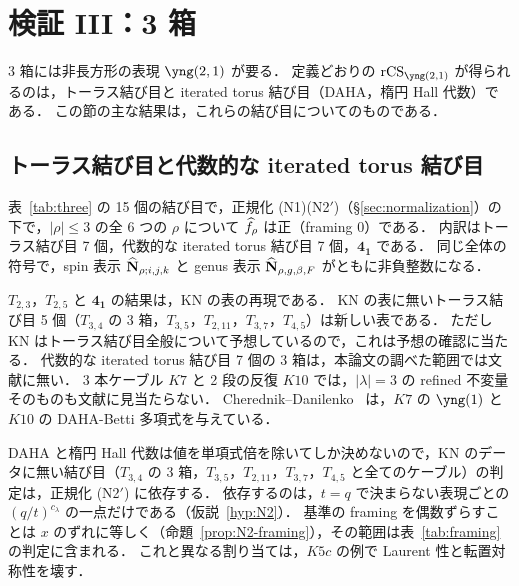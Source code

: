 \section{検証 III：3 箱}\label{sec:three}

3 箱には非長方形の表現 $\yng(2,1)$ が要る．
定義どおりの $\rCS_{\yng(2,1)}$ が得られるのは，トーラス結び目と iterated torus 結び目（DAHA，楕円 Hall 代数）である．
この節の主な結果は，これらの結び目についてのものである．

\subsection{トーラス結び目と代数的な iterated torus 結び目}
\begin{compresult}\label{cr:three}
表~\ref{tab:three} の 15 個の結び目で，正規化 (N1)(N2$'$)（\S\ref{sec:normalization}）の下で，$|\rho|\le3$ の全 6 つの $\rho$ について $\widehat{f}_\rho$ は正（framing 0）である．
内訳はトーラス結び目 7 個，代数的な iterated torus 結び目 7 個，$\mathbf{4_1}$ である．
同じ全体の符号で，spin 表示 $\widehat{\mathbf{N}}_{\rho;i,j,k}$ と genus 表示 $\widehat{\mathbf{N}}_{\rho,g,\beta,F}$ がともに非負整数になる．
\end{compresult}

\begin{table}[h]
\centering
\caption[3 箱までの判定（framing 0）]{3 箱までの判定（framing 0）．$\checkmark(n)$ は spin 表示と genus 表示の両方で負の項が 0 で，$n$ は spin 表示の項数．
$T_{2,3}$，$T_{2,5}$ と $\mathbf{4_1}$ は KN の表の再現である．$\mathbf{4_1}$ の $\yng(2,1)$ は KN の候補を用いた．}\label{tab:three}
\resizebox{\textwidth}{!}{}
\end{table}

$T_{2,3}$，$T_{2,5}$ と $\mathbf{4_1}$ の結果は，KN の表の再現である．
KN の表に無いトーラス結び目 5 個（$T_{3,4}$ の 3 箱，$T_{3,5}$，$T_{2,11}$，$T_{3,7}$，$T_{4,5}$）は新しい表である．
ただし KN はトーラス結び目全般について予想しているので，これは予想の確認に当たる．
代数的な iterated torus 結び目 7 個の 3 箱は，本論文の調べた範囲では文献に無い．
3 本ケーブル $K7$ と 2 段の反復 $K10$ では，$|\lambda|=3$ の refined 不変量そのものも文献に見当たらない．
Cherednik--Danilenko~\cite{Cherednik14} は，$K7$ の $\yng(1)$ と $K10$ の DAHA-Betti 多項式を与えている．

\begin{remark}[正規化への依存]
DAHA と楕円 Hall 代数は値を単項式倍を除いてしか決めないので，KN のデータに無い結び目（$T_{3,4}$ の 3 箱，$T_{3,5}$，$T_{2,11}$，$T_{3,7}$，$T_{4,5}$ と全てのケーブル）の判定は，正規化 (N2$'$) に依存する．
依存するのは，$t=q$ で決まらない表現ごとの $(q/t)^{c_\lambda}$ の一点だけである（仮説~\ref{hyp:N2}）．
基準の framing を偶数ずらすことは $x$ のずれに等しく（命題~\ref{prop:N2-framing}），その範囲は表~\ref{tab:framing} の判定に含まれる．
これと異なる割り当ては，$K5c$ の例で Laurent 性と転置対称性を壊す．
\end{remark}

